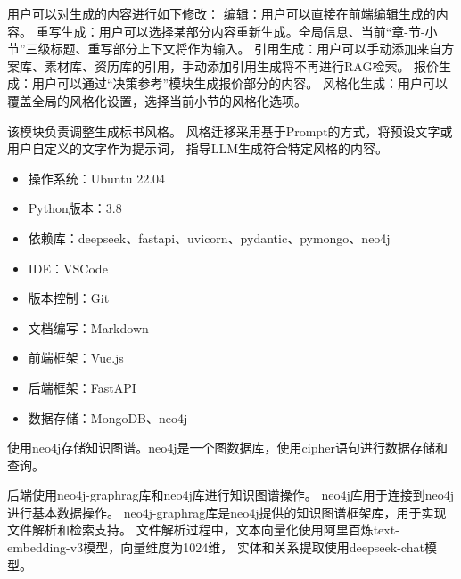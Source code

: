 \documentclass{xmu}
\begin{document}
用户可以对生成的内容进行如下修改：
编辑：用户可以直接在前端编辑生成的内容。
重写生成：用户可以选择某部分内容重新生成。全局信息、当前“章-节-小节”三级标题、重写部分上下文将作为输入。
引用生成：用户可以手动添加来自方案库、素材库、资历库的引用，手动添加引用生成将不再进行RAG检索。
报价生成：用户可以通过“决策参考”模块生成报价部分的内容。
风格化生成：用户可以覆盖全局的风格化设置，选择当前小节的风格化选项。

该模块负责调整生成标书风格。
风格迁移采用基于Prompt的方式，将预设文字或用户自定义的文字作为提示词，
指导LLM生成符合特定风格的内容。


        \begin{itemize}
            \item 操作系统：Ubuntu 22.04
            \item Python版本：3.8
            \item 依赖库：deepseek、fastapi、uvicorn、pydantic、pymongo、neo4j
        \end{itemize}
        \begin{itemize}
            \item IDE：VSCode
            \item 版本控制：Git
            \item 文档编写：Markdown
        \end{itemize}
        \begin{itemize}
            \item 前端框架：Vue.js
            \item 后端框架：FastAPI
            \item 数据存储：MongoDB、neo4j
        \end{itemize}
        使用neo4j存储知识图谱。neo4j是一个图数据库，使用cipher语句进行数据存储和查询。\par
        后端使用neo4j-graphrag库和neo4j库进行知识图谱操作。
        neo4j库用于连接到neo4j进行基本数据操作。
        neo4j-graphrag库是neo4j提供的知识图谱框架库，用于实现文件解析和检索支持。
        文件解析过程中，文本向量化使用阿里百炼text-embedding-v3模型，向量维度为1024维，
        实体和关系提取使用deepseek-chat模型。
\end{document}
